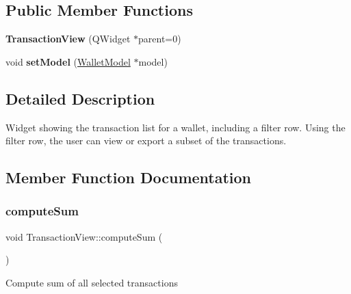 \subsection*{Public Member Functions}
\begin{DoxyCompactItemize}
\item 
\mbox{\label{class_transaction_view_a0c5e8b90206b4e8b8bf68dd7e319798f}} 
{\bfseries Transaction\+View} (Q\+Widget $\ast$parent=0)
\item 
\mbox{\label{class_transaction_view_a4920c2cd57d72eb50248948fa160c83c}} 
void {\bfseries set\+Model} (\mbox{\hyperlink{class_wallet_model}{Wallet\+Model}} $\ast$model)
\end{DoxyCompactItemize}


\subsection{Detailed Description}
Widget showing the transaction list for a wallet, including a filter row. Using the filter row, the user can view or export a subset of the transactions. 

\subsection{Member Function Documentation}
\mbox{\label{class_transaction_view_abb2ea48a61bb12a0dda9d63952adc50e}} 
\subsubsection{\texorpdfstring{compute\+Sum}{computeSum}}
{\footnotesize\ttfamily void Transaction\+View\+::compute\+Sum (\begin{DoxyParamCaption}{ }\end{DoxyParamCaption})\hspace{0.3cm}{\ttfamily [slot]}}

Compute sum of all selected transactions \mbox{\label{class_transaction_view_a56d909951088cfc74b8b18fc2693e3b1}} 
